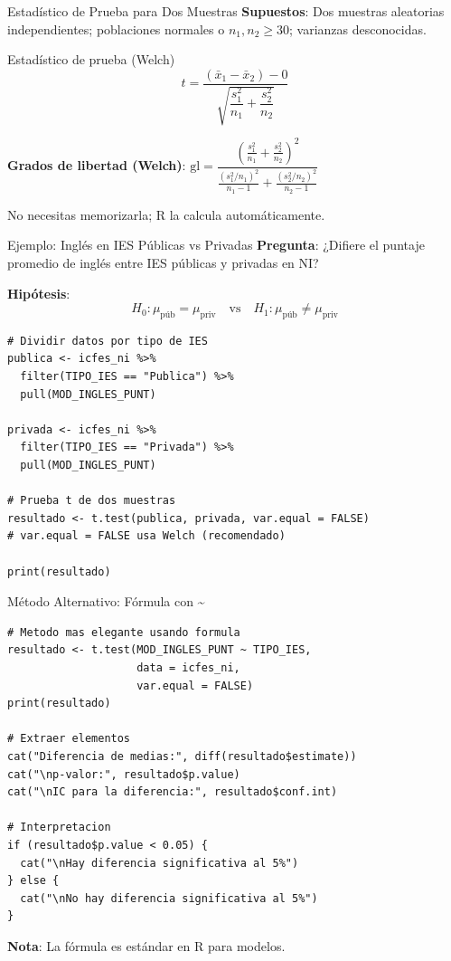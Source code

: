 \documentclass[aspectratio=169, 11pt]{beamer}
\begin{document}
\begin{frame}{Estadístico de Prueba para Dos Muestras}
\textbf{Supuestos}: Dos muestras aleatorias \alert{independientes}; poblaciones normales o $n_1, n_2 \geq 30$; varianzas desconocidas.

\vspace{0.2cm}
\begin{block}{Estadístico de prueba (Welch)}
\[
t = \frac{(\bar{x}_1 - \bar{x}_2) - 0}{\sqrt{\dfrac{s_1^2}{n_1} + \dfrac{s_2^2}{n_2}}}
\]
\end{block}

\vspace{0.2cm}
\textbf{Grados de libertad (Welch)}: \quad
$\text{gl} = \dfrac{\left(\frac{s_1^2}{n_1} + \frac{s_2^2}{n_2}\right)^2}{\frac{(s_1^2/n_1)^2}{n_1-1} + \frac{(s_2^2/n_2)^2}{n_2-1}}$

\smallskip
\small No necesitas memorizarla; R la calcula automáticamente.
\end{frame}

\begin{frame}[fragile]{Ejemplo: Inglés en IES Públicas vs Privadas}
\small
\textbf{Pregunta}: ¿Difiere el puntaje promedio de inglés entre IES públicas y privadas en NI?

\vspace{0.2cm}
\textbf{Hipótesis}:
\[
H_0: \mu_{\text{púb}} = \mu_{\text{priv}} \quad \text{vs} \quad H_1: \mu_{\text{púb}} \neq \mu_{\text{priv}}
\]

\begin{lstlisting}
# Dividir datos por tipo de IES
publica <- icfes_ni %>%
  filter(TIPO_IES == "Publica") %>%
  pull(MOD_INGLES_PUNT)

privada <- icfes_ni %>%
  filter(TIPO_IES == "Privada") %>%
  pull(MOD_INGLES_PUNT)

# Prueba t de dos muestras
resultado <- t.test(publica, privada, var.equal = FALSE)
# var.equal = FALSE usa Welch (recomendado)

print(resultado)
\end{lstlisting}
\end{frame}

\begin{frame}[fragile]{Método Alternativo: Fórmula con \textasciitilde}
\begin{lstlisting}
# Metodo mas elegante usando formula
resultado <- t.test(MOD_INGLES_PUNT ~ TIPO_IES,
                    data = icfes_ni,
                    var.equal = FALSE)
print(resultado)

# Extraer elementos
cat("Diferencia de medias:", diff(resultado$estimate))
cat("\np-valor:", resultado$p.value)
cat("\nIC para la diferencia:", resultado$conf.int)

# Interpretacion
if (resultado$p.value < 0.05) {
  cat("\nHay diferencia significativa al 5%")
} else {
  cat("\nNo hay diferencia significativa al 5%")
}
\end{lstlisting}
\small
\textbf{Nota}: La fórmula  es estándar en R para modelos.
\end{frame}
\end{document}

